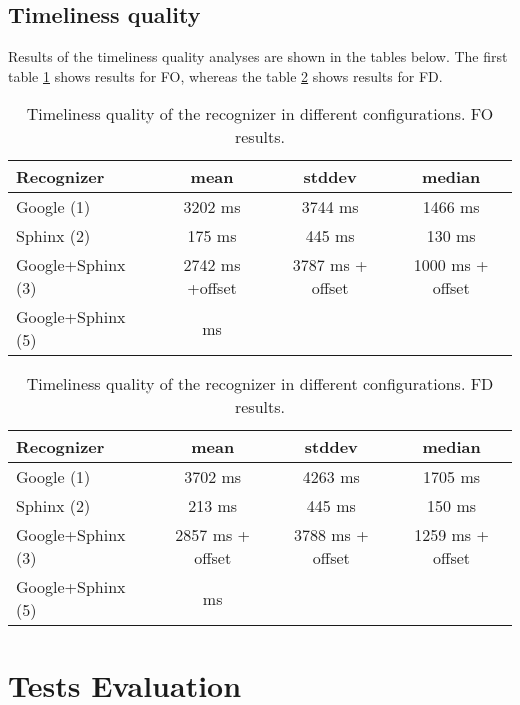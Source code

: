 \subsection {Timeliness quality}
Results of the timeliness quality analyses are shown in the tables below.
The first table \ref{tab:FO} shows results for
FO, whereas the table \ref{tab:FD} shows results for FD. 
\begin {table}
\label{tab:FO} 
\begin{center}
\caption {Timeliness quality of the recognizer in different configurations. FO
results.}
    \begin{tabular}{ l  c  c  c }
    \toprule
    Recognizer & mean & stddev & median \\ \toprule
    Google (1)  & 3202 ms & 3744 ms &  1466 ms\\
    Sphinx (2)  &175 ms & 445 ms & 130 ms \\
    Google+Sphinx (3)  & 2742 ms +offset  & 3787 ms + offset & 1000 ms + offset 
    \\
    Google+Sphinx (5)  & ms & &  \\ \bottomrule  
    \end{tabular}
\end{center}
\end {table}

\begin {table}
\label{tab:FD} 
\begin{center}
\caption {Timeliness quality of the recognizer in different configurations. FD
results.}
    \begin{tabular}{ l  c  c  c }
    \toprule
    Recognizer & mean & stddev & median \\ \toprule
    Google (1)  & 3702 ms & 4263 ms & 1705 ms  \\ 
    Sphinx (2)  & 213 ms & 445 ms & 150 ms \\ 
    Google+Sphinx (3)  & 2857 ms + offset & 3788 ms + 
    offset   & 1259 ms + offset \\
    Google+Sphinx (5)  & ms  & &\\ \bottomrule   
    \end{tabular}
\end{center}
\end {table}

\section {Tests Evaluation} 